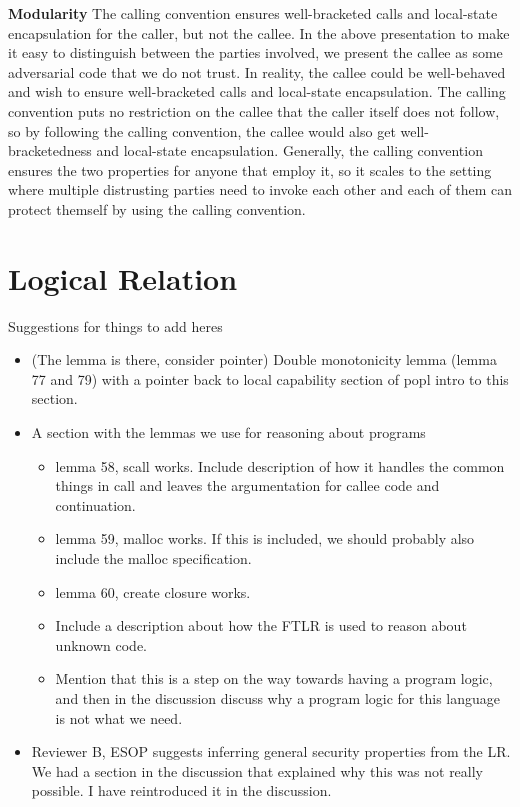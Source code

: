\documentclass[format=acmsmall, review=false, screen=true]{acmart}
\newenvironment{toplas}
    {\color{OliveGreen}
          
    }{}
\newcommand{\itoplassug}[1]
    {{\color{Blue} #1}}
\begin{document}
\begin{toplas}
  \textbf{Modularity} The calling convention ensures well-bracketed calls and local-state encapsulation for the caller, but not the callee. In the above presentation to make it easy to distinguish between the parties involved, we present the callee as some adversarial code that we do not trust. In reality, the callee could be well-behaved and wish to ensure well-bracketed calls and local-state encapsulation. The calling convention puts no restriction on the callee that the caller itself does not follow, so by following the calling convention, the callee would also get well-bracketedness and local-state encapsulation. Generally, the calling convention ensures the two properties for anyone that employ it, so it scales to the setting where multiple distrusting parties need to invoke each other and each of them can protect themself by using the calling convention.
\end{toplas}

\section{Logical Relation}
\label{sec:logical-relation}
\itoplassug{Suggestions for things to add heres
  \begin{itemize}
  \item (The lemma is there, consider pointer) Double monotonicity lemma (lemma 77 and 79) with a pointer back to local capability section of popl intro to this section.
  \item A section with the lemmas we use for reasoning about programs
    \begin{itemize}
    \item lemma 58, scall works. Include description of how it handles the common things in call and leaves the argumentation for callee code and continuation.
    \item lemma 59, malloc works. If this is included, we should probably also include the malloc specification.
    \item lemma 60, create closure works.
    \item Include a description about how the FTLR is used to reason about unknown code.
    \item Mention that this is a step on the way towards having a program logic, and then in the discussion discuss why a program logic for this language is not what we need.
    \end{itemize}
  \item Reviewer B, ESOP suggests inferring general security properties from the LR. We had a section in the discussion that explained why this was not really possible. I have reintroduced it in the discussion.
  \end{itemize}
}
\end{document}
